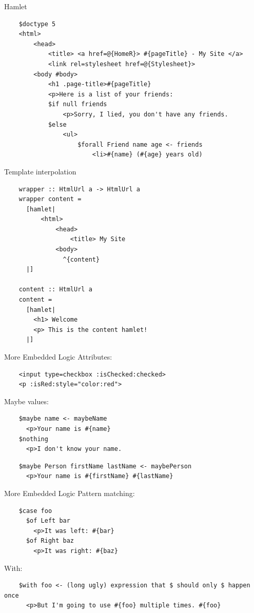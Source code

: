 \documentclass[pdf]{beamer}
\begin{document}
\begin{frame}[fragile]{Hamlet}
  \begin{verbatim}
    $doctype 5
    <html>
        <head>
            <title> <a href=@{HomeR}> #{pageTitle} - My Site </a>
            <link rel=stylesheet href=@{Stylesheet}>
        <body #body>
            <h1 .page-title>#{pageTitle}
            <p>Here is a list of your friends:
            $if null friends
                <p>Sorry, I lied, you don't have any friends.
            $else
                <ul>
                    $forall Friend name age <- friends
                        <li>#{name} (#{age} years old)
  \end{verbatim}
\end{frame}

\begin{frame}[fragile]{Template interpolation}
  \begin{verbatim}
    wrapper :: HtmlUrl a -> HtmlUrl a
    wrapper content =
      [hamlet|
          <html>
              <head>
                  <title> My Site
              <body>
                ^{content}
      |]

    content :: HtmlUrl a
    content =
      [hamlet|
        <h1> Welcome
        <p> This is the content hamlet!
      |]
  \end{verbatim}
\end{frame}

\begin{frame}[fragile]{More Embedded Logic}
  Attributes:\\
  \begin{verbatim}
    <input type=checkbox :isChecked:checked>
    <p :isRed:style="color:red">
  \end{verbatim}
  \pause
  Maybe values:\\
  \begin{verbatim}
    $maybe name <- maybeName
      <p>Your name is #{name}
    $nothing
      <p>I don't know your name.
  \end{verbatim}
  \pause
  \begin{verbatim}
    $maybe Person firstName lastName <- maybePerson
      <p>Your name is #{firstName} #{lastName}
  \end{verbatim}
\end{frame}

\begin{frame}[fragile]{More Embedded Logic}
  Pattern matching:\\
  \begin{verbatim}
    $case foo
      $of Left bar
        <p>It was left: #{bar}
      $of Right baz
        <p>It was right: #{baz}
  \end{verbatim}
  \pause
  With:\\
  \begin{verbatim}
    $with foo <- (long ugly) expression that $ should only $ happen once
      <p>But I'm going to use #{foo} multiple times. #{foo}
  \end{verbatim}
\end{frame}
\end{document}
